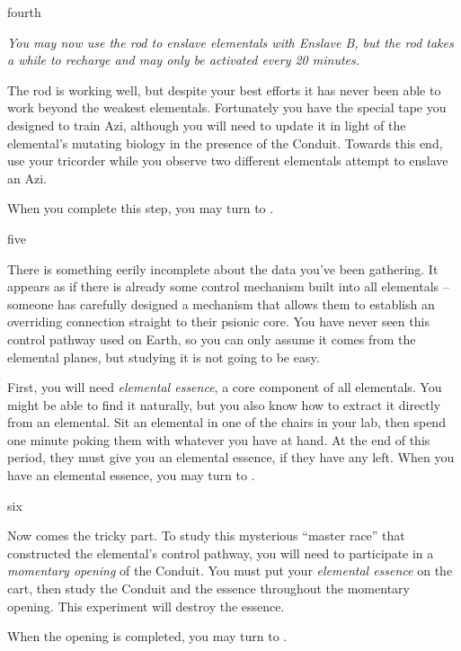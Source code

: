 \documentclass[notebook]{elementals}
\begin{document}
\begin{page}{fourth}

\emph{You may now use the rod to enslave elementals with Enslave B, but the rod takes a while to recharge and may only be activated every 20 minutes.}

The rod is working well, but despite your best efforts it has never been able to work beyond the weakest elementals. Fortunately you have the special tape you designed to train Azi, although you will need to update it in light of the elemental's mutating biology in the presence of the Conduit. Towards this end, use your tricorder while you observe two different elementals attempt to enslave an Azi.

When you complete this step, you may turn to .

\end{page}

\begin{page}{five}

There is something eerily incomplete about the data you've been gathering. It appears as if there is already some control mechanism built into all elementals -- someone has carefully designed a mechanism that allows them to establish an overriding connection straight to their psionic core. You have never seen this control pathway used on Earth, so you can only assume it comes from the elemental planes, but studying it is not going to be easy.

First, you will need \emph{elemental essence}, a core component of all elementals. You might be able to find it naturally, but you also know how to extract it directly from an elemental. Sit an elemental in one of the chairs in your lab, then spend one minute poking them with whatever you have at hand. At the end of this period, they must give you an elemental essence, if they have any left. When you have an elemental essence, you may turn to .

\end{page}

\begin{page}{six}

Now comes the tricky part. To study this mysterious ``master race'' that constructed the elemental's control pathway, you will need to participate in a \emph{momentary opening} of the Conduit. You must put your \emph{elemental essence} on the cart, then study the Conduit and the essence throughout the momentary opening. This experiment will destroy the essence.

When the opening is completed, you may turn to .

\end{page}
\end{document}
